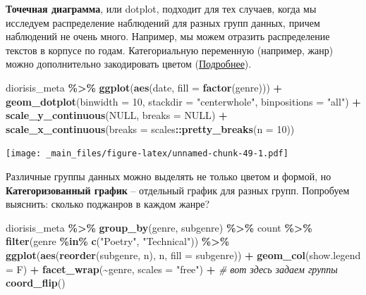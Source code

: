 \documentclass[
]{book}
\newenvironment{Shaded}{\begin{snugshade}}{\end{snugshade}}
\newcommand{\AttributeTok}[1]{\textcolor[rgb]{0.13,0.29,0.53}{#1}}
\newcommand{\CommentTok}[1]{\textcolor[rgb]{0.56,0.35,0.01}{\textit{#1}}}
\newcommand{\ConstantTok}[1]{\textcolor[rgb]{0.56,0.35,0.01}{#1}}
\newcommand{\DecValTok}[1]{\textcolor[rgb]{0.00,0.00,0.81}{#1}}
\newcommand{\FunctionTok}[1]{\textcolor[rgb]{0.13,0.29,0.53}{\textbf{#1}}}
\newcommand{\NormalTok}[1]{#1}
\newcommand{\SpecialCharTok}[1]{\textcolor[rgb]{0.81,0.36,0.00}{\textbf{#1}}}
\newcommand{\StringTok}[1]{\textcolor[rgb]{0.31,0.60,0.02}{#1}}
\theoremstyle{definition}
\theoremstyle{definition}
\theoremstyle{definition}
\theoremstyle{definition}
\theoremstyle{remark}
\begin{document}
\textbf{Точечная диаграмма}, или dotplot, подходит для тех случаев, когда мы исследуем распределение наблюдений для разных групп данных, причем наблюдений не очень много. Например, мы можем отразить распределение текстов в корпусе по годам. Категориальную переменную (например, жанр) можно дополнительно закодировать цветом (\href{https://t.me/antibarbari/109}{Подробнее}).

\begin{Shaded}
\begin{Highlighting}[]
\NormalTok{diorisis\_meta }\SpecialCharTok{\%\textgreater{}\%} \FunctionTok{ggplot}\NormalTok{(}\FunctionTok{aes}\NormalTok{(date, }\AttributeTok{fill =} \FunctionTok{factor}\NormalTok{(genre))) }\SpecialCharTok{+} 
  \FunctionTok{geom\_dotplot}\NormalTok{(}\AttributeTok{binwidth =} \DecValTok{10}\NormalTok{, }\AttributeTok{stackdir =} \StringTok{"centerwhole"}\NormalTok{, }\AttributeTok{binpositions =} \StringTok{"all"}\NormalTok{) }\SpecialCharTok{+}  
  \FunctionTok{scale\_y\_continuous}\NormalTok{(}\ConstantTok{NULL}\NormalTok{, }\AttributeTok{breaks =} \ConstantTok{NULL}\NormalTok{) }\SpecialCharTok{+} 
  \FunctionTok{scale\_x\_continuous}\NormalTok{(}\AttributeTok{breaks =}\NormalTok{ scales}\SpecialCharTok{::}\FunctionTok{pretty\_breaks}\NormalTok{(}\AttributeTok{n =} \DecValTok{10}\NormalTok{))}
\end{Highlighting}
\end{Shaded}

\texttt{[image: \_main\_files/figure-latex/unnamed-chunk-49-1.pdf]}

Различные группы данных можно выделять не только цветом и формой, но \textbf{Категоризованный график} -- отдельный график для разных групп. Попробуем выяснить: сколько поджанров в каждом жанре?

\begin{Shaded}
\begin{Highlighting}[]
\NormalTok{diorisis\_meta }\SpecialCharTok{\%\textgreater{}\%} 
  \FunctionTok{group\_by}\NormalTok{(genre, subgenre) }\SpecialCharTok{\%\textgreater{}\%} 
\NormalTok{  count }\SpecialCharTok{\%\textgreater{}\%}
  \FunctionTok{filter}\NormalTok{(genre }\SpecialCharTok{\%in\%} \FunctionTok{c}\NormalTok{(}\StringTok{"Poetry"}\NormalTok{, }\StringTok{"Technical"}\NormalTok{)) }\SpecialCharTok{\%\textgreater{}\%} 
  \FunctionTok{ggplot}\NormalTok{(}\FunctionTok{aes}\NormalTok{(}\FunctionTok{reorder}\NormalTok{(subgenre, n), n, }\AttributeTok{fill =}\NormalTok{ subgenre)) }\SpecialCharTok{+} 
  \FunctionTok{geom\_col}\NormalTok{(}\AttributeTok{show.legend =}\NormalTok{ F) }\SpecialCharTok{+}
  \FunctionTok{facet\_wrap}\NormalTok{(}\SpecialCharTok{\textasciitilde{}}\NormalTok{genre, }\AttributeTok{scales =} \StringTok{"free"}\NormalTok{) }\SpecialCharTok{+} \CommentTok{\# вот здесь задаем  группы}
  \FunctionTok{coord\_flip}\NormalTok{()}
\end{Highlighting}
\end{Shaded}
\end{document}
